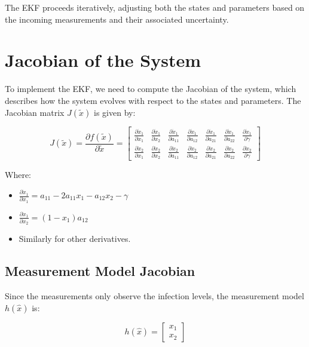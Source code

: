 \documentclass[a4paper,10pt]{report}
\begin{document}
The EKF proceeds iteratively, adjusting both the states and parameters based on the incoming measurements and their associated uncertainty.

\section{Jacobian of the System}

To implement the EKF, we need to compute the Jacobian of the system, which describes how the system evolves with respect to the states and parameters. The Jacobian matrix \( J(\tilde{x}) \) is given by:

\[
J(\tilde{x}) = \frac{\partial f(\tilde{x})}{\partial \tilde{x}} = \begin{bmatrix}
\frac{\partial \dot{x}_1}{\partial x_1} & \frac{\partial \dot{x}_1}{\partial x_2} & \frac{\partial \dot{x}_1}{\partial a_{11}} & \frac{\partial \dot{x}_1}{\partial a_{12}} & \frac{\partial \dot{x}_1}{\partial a_{21}} & \frac{\partial \dot{x}_1}{\partial a_{22}} & \frac{\partial \dot{x}_1}{\partial \gamma} \\
\frac{\partial \dot{x}_2}{\partial x_1} & \frac{\partial \dot{x}_2}{\partial x_2} & \frac{\partial \dot{x}_2}{\partial a_{11}} & \frac{\partial \dot{x}_2}{\partial a_{12}} & \frac{\partial \dot{x}_2}{\partial a_{21}} & \frac{\partial \dot{x}_2}{\partial a_{22}} & \frac{\partial \dot{x}_2}{\partial \gamma}
\end{bmatrix}
\]

Where:

\begin{itemize}
\item \(
\frac{\partial \dot{x}_1}{\partial x_1} = a_{11} - 2a_{11} x_1 - a_{12} x_2 - \gamma
\)
\item \(
\frac{\partial \dot{x}_1}{\partial x_2} = (1 - x_1) a_{12}
\)
\item Similarly for other derivatives.
\end{itemize}

\subsection{Measurement Model Jacobian}

Since the measurements only observe the infection levels, the measurement model \( h(\hat{x}) \) is:

\[
h(\hat{x}) = \begin{bmatrix} x_1 \\ x_2 \end{bmatrix}
\]
\end{document}
